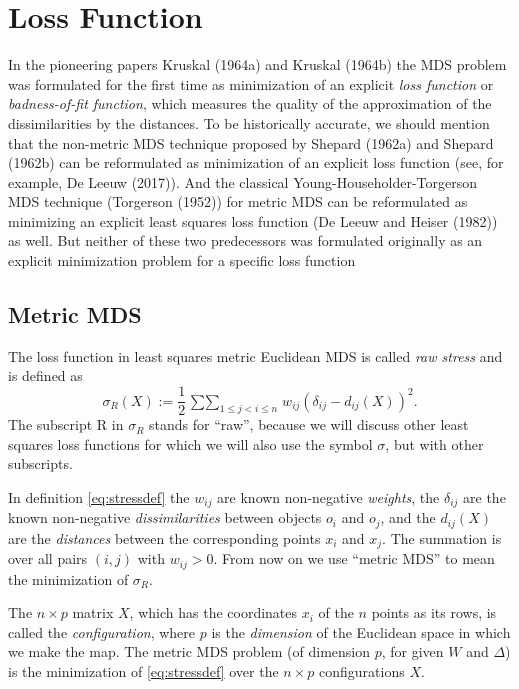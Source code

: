 \documentclass[
  12pt,
]{article}
\begin{document}
\section{Loss Function}\label{loss-function}

In the pioneering papers Kruskal (1964a) and Kruskal (1964b) the MDS problem
was formulated for the first time as minimization of an explicit \emph{loss
function} or \emph{badness-of-fit function}, which measures the quality of the approximation of the dissimilarities by the distances. To be historically accurate, we should
mention that the non-metric MDS technique proposed by Shepard (1962a) and Shepard (1962b) can be reformulated as minimization of an explicit loss function (see, for example, De Leeuw (2017)). And the classical Young-Householder-Torgerson MDS technique (Torgerson (1952)) for metric MDS can be reformulated as minimizing an explicit least squares loss function (De Leeuw and Heiser (1982)) as well.
But neither of these two predecessors was formulated originally as an explicit minimization
problem for a specific loss function

\subsection{Metric MDS}\label{metric-mds}

The loss function in least squares
metric Euclidean MDS is called \emph{raw stress}
and is defined as
\begin{equation}
\sigma_R(X):=\frac12\mathop{\sum\sum}_{1\leq j<i\leq n}w_{ij}(\delta_{ij}-d_{ij}(X))^2.
\label{eq:stressdef}
\end{equation}
The subscript R in \(\sigma_R\) stands for ``raw'', because we will discuss
other least squares loss functions for which we will also use the
symbol \(\sigma\), but with other subscripts.

In definition
\eqref{eq:stressdef} the \(w_{ij}\) are known non-negative \emph{weights}, the
\(\delta_{ij}\) are the known non-negative \emph{dissimilarities} between
objects \(o_i\) and \(o_j\), and the \(d_{ij}(X)\) are the \emph{distances} between
the corresponding points \(x_i\) and \(x_j\). The summation is over all
pairs \((i,j)\) with \(w_{ij}>0\). From now on we use ``metric
MDS'' to mean the minimization of \(\sigma_R\).

The \(n\times p\) matrix \(X\), which has the coordinates \(x_i\) of the \(n\)
points as its rows, is called the \emph{configuration}, where \(p\) is the
\emph{dimension} of the Euclidean space in which we make the map.
The metric MDS problem (of dimension \(p\), for given \(W\)
and \(\Delta\)) is the minimization of \eqref{eq:stressdef} over the
\(n\times p\) configurations \(X\).
\end{document}
